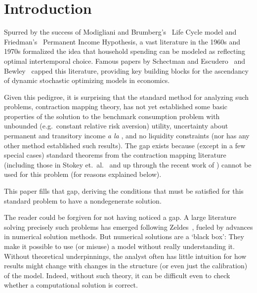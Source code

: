 \documentclass[titlepage]{\econtex}\providecommand{\texname}{BufferStockTheory}%
\begin{document}
\titlepagefinish


\newtheorem{defn}{Definition}
\newtheorem{theorem}{Theorem}

\section{Introduction}

\label{sec:intro}

Spurred by the success of Modigliani and Brumberg's~\citeyearpar{modigliani&brumberg:lifecycle} Life Cycle model and Friedman's~\citeyearpar{friedmanATheory} Permanent Income Hypothesis, a vast literature in the 1960s and 1970s formalized the idea that household spending can be modeled as reflecting optimal intertemporal choice.  Famous papers by Schectman and Escudero~\citeyearpar{schectman&escudero:results} and Bewley~\citeyearpar{bewleyPIH} capped this literature, providing key building blocks for the ascendancy of dynamic stochastic optimizing models in economics.

Given this pedigree, it is surprising that the standard method for analyzing such problems, contraction mapping theory, has not yet established some basic properties of the solution to the benchmark consumption problem with unbounded (e.g.\ constant relative risk aversion) utility, uncertainty about permanent and transitory income {\it a la} \cite{friedmanATheory}, and no liquidity constraints (nor has any other method established such results).  The gap exists because (except in a few special cases) standard theorems from the contraction mapping literature (including those in Stokey et.~al.~\citeyearpar{slpMethods} and up through the recent work of \cite{mnUnique}) cannot be used for this problem (for reasons explained below).

This paper fills that gap, deriving the conditions that must be satisfied for this standard problem to have a nondegenerate solution.

The reader could be forgiven for not having noticed a gap.  A large literature solving precisely such problems has emerged following Zeldes~\citeyearpar{zeldesStochastic}, fueled by advances in numerical solution methods.  But numerical solutions are a `black box': They make it possible to use (or misuse) a model without really understanding it.  Without theoretical underpinnings, the analyst often has little intuition for how results might change with changes in the structure (or even just the calibration) of the model.  Indeed, without such theory, it can be difficult even to check whether a computational solution is correct.  
\end{document}
